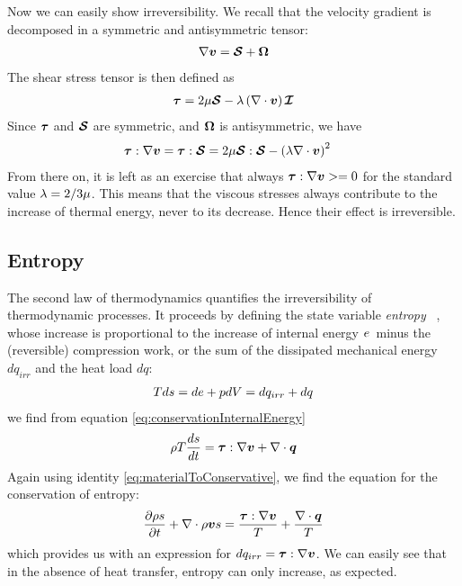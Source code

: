 Now we can easily show irreversibility. We recall that the velocity
gradient is decomposed in a symmetric and antisymmetric tensor:
\begin{align*}
  \nabla \boldsymbol {v} = \boldsymbol {\boldsymbol {\mathcal S}} + \boldsymbol {\Omega}
\end{align*}
The shear stress tensor is then defined as
\begin{align*} 
  \boldsymbol {\tau} = 2 \mu \boldsymbol {\boldsymbol {\mathcal S}} - \lambda \left(\nabla \cdot \boldsymbol {v}\right) \boldsymbol {\mathcal I} \\
\end{align*} 
Since $\boldsymbol {\tau}$ and $\boldsymbol {\boldsymbol {\mathcal S}}$ are symmetric, and
$\boldsymbol {\Omega}$ is antisymmetric, we have
\begin{align*}
  \boldsymbol {\tau} : \nabla \boldsymbol {v} &= \boldsymbol {\tau} : \boldsymbol {\boldsymbol {\mathcal S}} = 2
  \mu \boldsymbol {\boldsymbol {\mathcal S}} : \boldsymbol {\boldsymbol {\mathcal S}} - \left(\lambda \nabla \cdot \boldsymbol {v}
  \right)^2
\end{align*}
From there on, it is left as an exercise that always $\boldsymbol {\tau} :
\nabla \boldsymbol {v} >= 0$ for the standard value $\lambda = 2/3
\mu$. This means that the viscous stresses always contribute to
the increase of thermal energy, never to its decrease. Hence their
effect is irreversible.

\subsection{Entropy}

The second law of thermodynamics quantifies the irreversibility of
thermodynamic processes. It proceeds by defining the state variable
\emph{entropy} \entr~, whose increase is proportional to the increase
of internal energy $e$~minus the (reversible) compression work, or
the sum of the dissipated mechanical energy $dq_{irr}$ and the heat
load $dq$:
\begin{align*}
  T d s = de + p d V = dq_{irr} + dq
\end{align*}
we find from equation \ref{eq:conservationInternalEnergy}
\begin{align*}
  \rho T \frac{ds}{dt} = \boldsymbol {\tau} : \nabla \boldsymbol {v} + \nabla \cdot \boldsymbol {q}
\end{align*}
Again using identity \ref{eq:materialToConservative}, we find the
equation for the conservation of entropy:
\begin{equation}
  \frac{\partial \rho s}{\partial t} + \nabla \cdot \rho \boldsymbol {v} s = 
  \frac{\boldsymbol {\tau} : \nabla \boldsymbol {v}}{T} + \frac{\nabla \cdot \boldsymbol {q}}{T}
\end{equation}
which provides us with an expression for $dq_{irr} = \boldsymbol {\tau} :
\nabla \boldsymbol {v}$. We can easily see that in the absence of heat transfer,
entropy can only increase, as expected.

